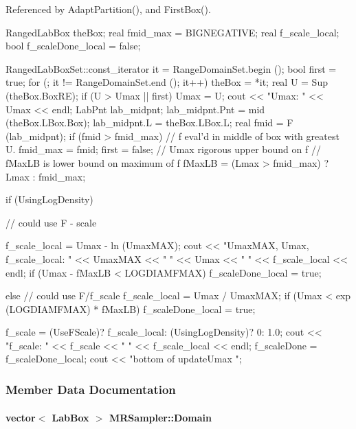 \-Referenced by \-Adapt\-Partition(), and \-First\-Box().


\begin{DoxyCode}
{
  RangedLabBox theBox;
  real fmid_max = BIGNEGATIVE;
  real f_scale_local;
  bool f_scaleDone_local = false;

  RangedLabBoxSet::const_iterator it = RangeDomainSet.begin ();
  bool first = true;
  for (; it != RangeDomainSet.end (); it++)
  {
    theBox = *it;
    real U = Sup (theBox.BoxRE);
    if (U > Umax || first)
    {
      Umax = U;
      cout << "Umax: " << Umax << endl;
      LabPnt lab_midpnt;
      lab_midpnt.Pnt = mid (theBox.LBox.Box);
      lab_midpnt.L = theBox.LBox.L;
      real fmid = F (lab_midpnt);
      if (fmid > fmid_max)
                    // f eval'd in middle of box with greatest U.
        fmid_max = fmid;
      first = false;
    }
  }
  //   Umax rigorous upper bound on f
                    // fMaxLB is lower bound on maximum of f
  fMaxLB = (Lmax > fmid_max) ? Lmax : fmid_max;

  if (UsingLogDensity)
  {
    // could use F - scale

    f_scale_local = Umax - ln (UmaxMAX);
    cout << "UmaxMAX, Umax, f_scale_local: " << UmaxMAX << " " 
         << Umax << " " << f_scale_local << endl;
    if (Umax - fMaxLB < LOGDIAMFMAX)
    {
      f_scaleDone_local = true;
    }
  }
  else
  {
    // could use F/f_scale
    f_scale_local = Umax / UmaxMAX;
    if (Umax < exp (LOGDIAMFMAX) * fMaxLB)
    {
      f_scaleDone_local = true;
    }
  }

  f_scale = (UseFScale)? f_scale_local: (UsingLogDensity)? 0: 1.0;
  cout << "f_scale: " << f_scale << "  " << f_scale_local << endl;
  f_scaleDone = f_scaleDone_local;
  cout << "bottom of updateUmax \n";
}
\end{DoxyCode}


\subsubsection{\-Member \-Data \-Documentation}
\hypertarget{classMRSampler_ab3c9a0e232b8145574c28989b9d25791}{
\paragraph[{\-Domain}]{\setlength{\rightskip}{0pt plus 5cm}vector$<$ {\bf \-Lab\-Box} $>$ {\bf \-M\-R\-Sampler\-::\-Domain}}}\label{classMRSampler_ab3c9a0e232b8145574c28989b9d25791}


